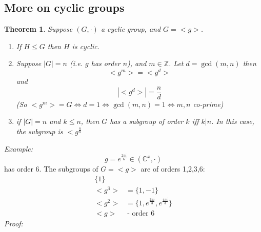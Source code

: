 \documentclass{report}
\newtheorem{theorem}{Theorem}[subsection]
\theoremstyle{remark}
\theoremstyle{definition}
\theoremstyle{definition}
\theoremstyle{theorem}
\begin{document}
\subsection{More on cyclic groups}
\begin{theorem}
Suppose $(G, \cdot)$ a cyclic group, and $G=<g>$.
\begin{enumerate}[label=\textcircled{\tiny{\arabic*}}]
    \item If $H \leq G$ then $H$ is cyclic.
    \item Suppose $|G|=n$ (i.e. $g$ has order $n$), and $m \in \mathbb{Z}$. Let $d=\gcd(m,n)$ then 
    \[<g^m>=<g^d>\]
    and
    \[|<g^d>|=\frac{n}{d}\]
    (So $<g^m>=G \iff d=1 \iff \gcd(m,n)=1 \iff m,n$ co-prime)
    \item if $|G|=n$ and $k \leq n$, then $G$ has a subgroup of order $k$ iff $k|n$. In this case, the subgroup is $<g^\frac{n}{k}$
\end{enumerate}
\end{theorem}
\emph{Example:}
\[g=e^{\frac{2\pi i}{6}} \in (\mathbb{C}^x, \cdot)\]
has order 6. The subgroups of $G=<g>$ are of orders 1,2,3,6:
\begin{align*}
    \{1\}&\\
    <g^3>&=\{1,-1\}\\
    <g^2>&=\{1,e^{\frac{2 \pi i}{3}}, e^{\frac{4 \pi i}{3}}\}\\
    <g> &\> \text{- order 6}
\end{align*}
\emph{Proof:}
\end{document}
